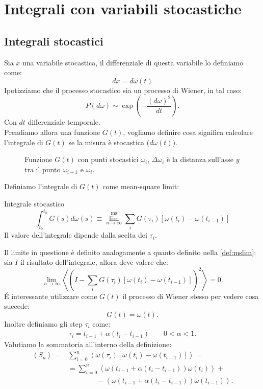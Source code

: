 \section{Integrali con variabili stocastiche}%
\label{sub:Lezione 7}
\mylocaltoc
\subsection{Integrali stocastici}%
\label{sub:Integrali stocastici}
Sia $x$ una variabile stocastica, il differenziale di questa variabile lo definiamo come:
\begin{equation}
    dx = d\omega (t) \label{eq:6_int}
\end{equation}
Ipotizziamo che il processo stocastico sia un processo di Wiener, in tal caso:
\[
    P(d\omega) \sim \exp\left(-\frac{\left(d\omega\right)^2}{dt}\right)
.\] 
Con $dt$ differenziale temporale.\\
Prendiamo allora una funzione $G(t)$, vogliamo definire cosa significa calcolare l'integrale di $G(t)$ se la misura è stocastica ($d\omega (t))$.
\begin{figure}[H]
    \centering
    \caption{\scriptsize Funzione $G(t)$ con punti stocastici $\omega_i$, $\Delta\omega_i$ è la distanza sull'asse $y$ tra il punto $\omega_{i-1}$ e $\omega_i$.}
    \label{fig:lez_6_int}
\end{figure}
\noindent
Definiamo l'integrale di $G(t)$ come mean-square limit:
\begin{redbox}{Integrale stocastico}
\[
    \int_{t_0}^{t_n} G(s) d\omega (s) \equiv \lim^{\text{ms}}_{n \to \infty} \sum_{i}^{} G(\tau_i) \left[\omega (t_i) - \omega (t_{i-1}) \right]
\] 
Il valore dell'integrale dipende dalla scelta dei $\tau_i$.
\end{redbox}
\noindent
Il limite in questione è definito analogamente a quanto definito nella \ref{def:mslim}: sia $I$ il risultato dell'integrale, allora deve valere che:
\[
    \lim_{n \to \infty} \left<\left(I -  \sum_{i}^{} G(\tau_i) \left[\omega (t_i) - \omega (t_{i-1}) \right]\right)^2\right> = 0
.\] 
\'E interessante utilizzare come $G(t)$ il processo di Wiener stesso per vedere cosa succede:
\[
    G(t) = \omega (t) 
.\]
Inoltre definiamo gli step $\tau_i$ come:
\[\begin{aligned}
    \tau_i = t_{i-1} + \alpha (t_i - t_{i-1}) \qquad 0 <\alpha <1 \label{eq:tau}
.\end{aligned}\]
Valutiamo la sommatoria all'interno della definizione:
\[\begin{aligned}
    \left<S_n\right> =& \sum_{i=0}^{n} \left<\omega (\tau_i)\left[ \omega (t_i) - \omega (t_{i-1})  \right] \right>=\\
		      & = \sum_{i=0}^{n} \left<\omega (t_{i-1} +\alpha (t_i-t_{i-1}) ) \omega(t_i) \right> + \\
		  & \qquad \qquad - \left<\omega (t_{i-1} +\alpha (t_i-t_{i-1}) ) \omega(t_{i-1}) \right>
.\end{aligned}\]
